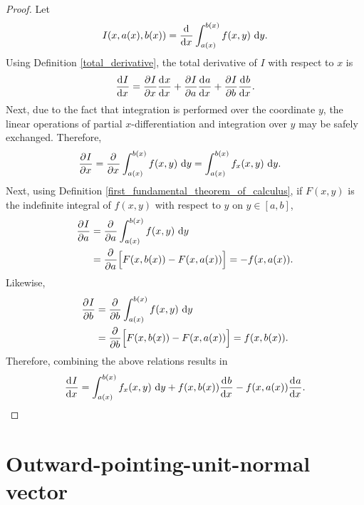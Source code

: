 \begin{proof}
Let
$$I(x,a(x),b(x)) = \frac{\mathrm{d}{^{}} }{\mathrm{d} x{^{}} } \int_{a(x)}^{b(x)} f(x,y) \ \mathrm{d}y.$$
Using Definition \ref{total_derivative}, the total derivative of $I$ with respect to $x$ is
$$\frac{\mathrm{d}{^{}} I}{\mathrm{d} x{^{}} } = \frac{\partial{^{}} I}{\partial x{^{}} } \frac{\mathrm{d}{^{}} x}{\mathrm{d} x{^{}} } + \frac{\partial{^{}} I}{\partial a{^{}} } \frac{\mathrm{d}{^{}} a}{\mathrm{d} x{^{}} } + \frac{\partial{^{}} I}{\partial b{^{}} } \frac{\mathrm{d}{^{}} b}{\mathrm{d} x{^{}} }.$$
Next, due to the fact that integration is performed over the coordinate $y$, the linear operations of partial $x$-differentiation and integration over $y$ may be safely exchanged.
Therefore,
\begin{align*}
  \frac{\partial{^{}} I}{\partial x{^{}} } &= \frac{\partial{^{}} }{\partial x{^{}} } \int_{a(x)}^{b(x)} f(x,y) \ \mathrm{d}y = \int_{a(x)}^{b(x)} f_x(x,y) \ \mathrm{d}y.
\end{align*}
Next, using Definition \ref{first_fundamental_theorem_of_calculus}, if $F(x,y)$ is the indefinite integral of $f(x,y)$ with respect to $y$ on $y \in [a,b]$,
\begin{align*}
  \frac{\partial{^{}} I}{\partial a{^{}} } &= \frac{\partial{^{}} }{\partial a{^{}} } \int_{a(x)}^{b(x)} f(x,y) \ \mathrm{d}y \\
                &= \frac{\partial{^{}} }{\partial a{^{}} } \Big[ F(x,b(x)) - F(x,a(x)) \Big] = - f(x,a(x)).
\end{align*}
Likewise,
\begin{align*}
  \frac{\partial{^{}} I}{\partial b{^{}} } &= \frac{\partial{^{}} }{\partial b{^{}} } \int_{a(x)}^{b(x)} f(x,y) \ \mathrm{d}y \\
                &= \frac{\partial{^{}} }{\partial b{^{}} } \Big[ F(x,b(x)) - F(x,a(x)) \Big] = f(x,b(x)).
\end{align*}
Therefore, combining the above relations results in
$$\frac{\mathrm{d}{^{}} I}{\mathrm{d} x{^{}} } = \int_{a(x)}^{b(x)} f_x(x,y) \ \mathrm{d}y + f(x,b(x))\frac{\mathrm{d}{^{}} b}{\mathrm{d} x{^{}} } - f(x,a(x))\frac{\mathrm{d}{^{}} a}{\mathrm{d} x{^{}} }.$$
\end{proof}

\section{Outward-pointing-unit-normal vector} \label{ssn_normal_vector}

